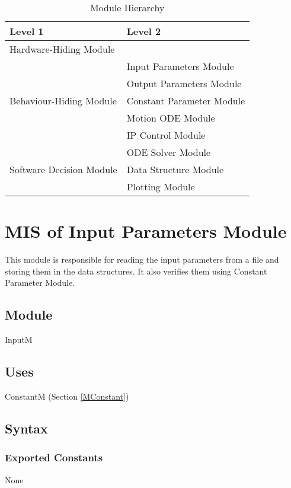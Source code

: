 \documentclass[12pt, titlepage]{article}
\begin{document}
\begin{table}[h!]
\centering
\begin{tabular}{p{} p{}}
\toprule
\textbf{Level 1} & \textbf{Level 2}\\
\midrule

{Hardware-Hiding Module} & ~ \\
\midrule

\multirow{5}{0.3\textwidth}{Behaviour-Hiding Module} & Input Parameters Module\\
& Output Parameters Module\\
& Constant Parameter Module\\
&Motion ODE  Module\\
& IP Control Module\\
\midrule

\multirow{3}{0.3\textwidth}{Software Decision Module} & {ODE Solver Module}\\
& Data Structure Module\\
& Plotting Module\\
\bottomrule

\end{tabular}
\caption{Module Hierarchy}
\label{TblMH}
\end{table}

\newpage


\section{ MIS of Input Parameters Module \label{MInput} }
This module is responsible for reading the input parameters from a file and storing them in the data structures. It also verifies them using Constant Parameter Module.

\subsection{Module}
InputM

\subsection{Uses}
ConstantM (Section \ref{MConstant})

\subsection{Syntax}



\subsubsection{Exported Constants}
None
\end{document}
